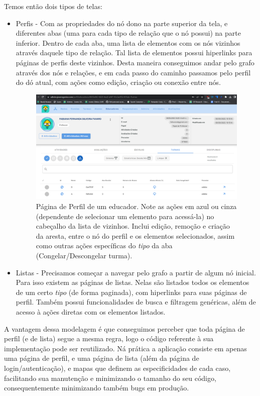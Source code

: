 Temos então dois tipos de telas:
\begin{itemize}
    \item Perfis - Com as propriedades do nó dono na parte superior da tela, e diferentes abas (uma para cada tipo de relação que o nó possui) na parte inferior. Dentro de cada aba, uma lista de elementos com os nós vizinhos através daquele tipo de relação. Tal lista de elementos possui hiperlinks para páginas de perfis deste vizinhos. Desta maneira conseguimos andar pelo grafo através dos nós e relações, e em cada passo do caminho passamos pelo perfil do dó atual, com ações como edição, criação ou conexão entre nós.
        
    \begin{figure}[H]
        \centering
        \includegraphics[width=1.0\linewidth]{Imagens/chap04/perfil-exemplo.png}
        \caption{Página de Perfil de um educador. Note as ações em azul ou cinza (dependente de selecionar um elemento para acessá-la) no cabeçalho da lista de vizinhos. Inclui edição, remoção e criação da aresta, entre o nó do perfil e os elementos selecionados, assim como outras ações específicas do \textit{tipo} da aba (Congelar/Descongelar turma).}
        \label{fig:profile-exemple}
    \end{figure}
    
    \item Listas - Precisamos começar a navegar pelo grafo a partir de algum nó inicial. Para isso existem as páginas de listas. Nelas são listados todos os elementos de um certo \textit{tipo} (de forma paginada), com hiperlinks para suas páginas de perfil. Também possui funcionalidades de busca e filtragem genéricas, além de acesso à ações diretas com os elementos listados.
\end{itemize}

A vantagem dessa modelagem é que conseguimos perceber que toda página de perfil (e de lista) segue a mesma regra, logo o código referente à sua implementação pode ser reutilizado. Ná prática a aplicação consiste em apenas uma página de perfil, e uma página de lista (além da página de login/autenticação), e mapas que definem as especificidades de cada caso, facilitando sua manutenção e minimizando o tamanho do seu código, consequentemente minimizando também bugs em produção.


